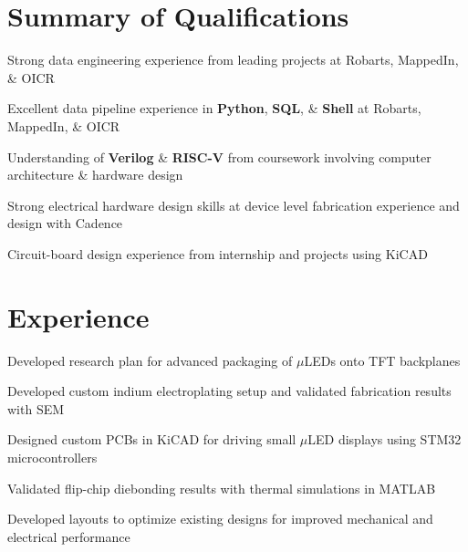 \documentclass[]{chandan-cv}
\begin{document}
\begin{minipage}[t]{0.75\textwidth}


\section{Summary of Qualifications}
\runsubsection{ }
\descript{ }
\location{ }
\vspace{\topsep} %
\begin{tightemize}
	\item Strong data engineering experience from leading projects at Robarts, MappedIn, \& OICR
	\item Excellent data pipeline experience in \textbf{Python}, \textbf{SQL}, \& \textbf{Shell} at Robarts, MappedIn, \& OICR 
	\item Understanding of \textbf{Verilog} \& \textbf{RISC-V} from coursework involving 
	computer architecture \& hardware design
	\item Strong electrical hardware design skills at device level fabrication experience and design with Cadence 
	\item Circuit-board design experience from internship and projects using KiCAD
\end{tightemize}
\sectionsep


\section{Experience}

\begin{tightemize}
        \item Developed research plan for advanced packaging of $\mu$LEDs onto TFT backplanes
		\item Developed custom indium electroplating setup and validated fabrication results with SEM
		\item Designed custom PCBs in KiCAD for driving small $\mu$LED displays using STM32 microcontrollers
		\item Validated flip-chip diebonding results with thermal simulations in MATLAB
		\item Developed layouts to optimize existing designs for improved mechanical and electrical performance
\end{tightemize}
\sectionsep


\end{minipage}
\end{document}

